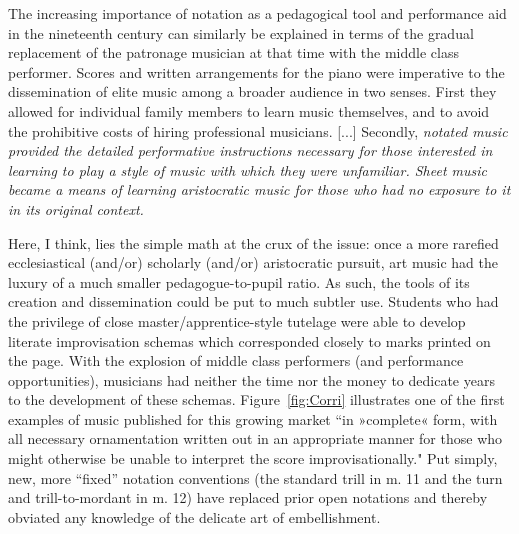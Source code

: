         \begin{smallquote}
            The increasing importance of notation as a pedagogical tool and performance aid in the nineteenth century can similarly be explained in terms of the gradual replacement of the patronage musician at that time with the middle class performer. Scores and written arrangements for the piano were imperative to the dissemination of elite music among a broader audience in two senses. First they allowed for individual family members to learn music themselves, and to avoid the prohibitive costs of hiring professional musicians. [...] Secondly, \textit{notated music provided the detailed performative instructions necessary for those interested in learning to play a style of music with which they were unfamiliar. Sheet music became a means of learning aristocratic music for those who had no exposure to it in its original context.\autocite[72]{Moore_1992}}
        \end{smallquote}

    Here, I think, lies the simple math at the crux of the issue: once a more rarefied ecclesiastical (and/or) scholarly (and/or) aristocratic pursuit, art music had the luxury of a much smaller pedagogue-to-pupil ratio. As such, the tools of its creation and dissemination could be put to much subtler use. Students who had the privilege of close master/apprentice-style tutelage were able to develop literate improvisation schemas which corresponded closely to marks printed on the page. With the explosion of middle class performers (and performance opportunities), musicians had neither the time nor the money to dedicate years to the development of these schemas. Figure~\ref{fig:Corri} illustrates one of the first examples of music published for this growing market ``in »complete« form, with all necessary ornamentation written out in an appropriate manner for those who might otherwise be unable to interpret the score improvisationally."\autocite[72]{Moore_1992} Put simply, new, more ``fixed'' notation conventions (the standard trill in m. 11 and the turn and trill-to-mordant in m. 12) have replaced prior open notations and thereby obviated any knowledge of the delicate art of embellishment.

